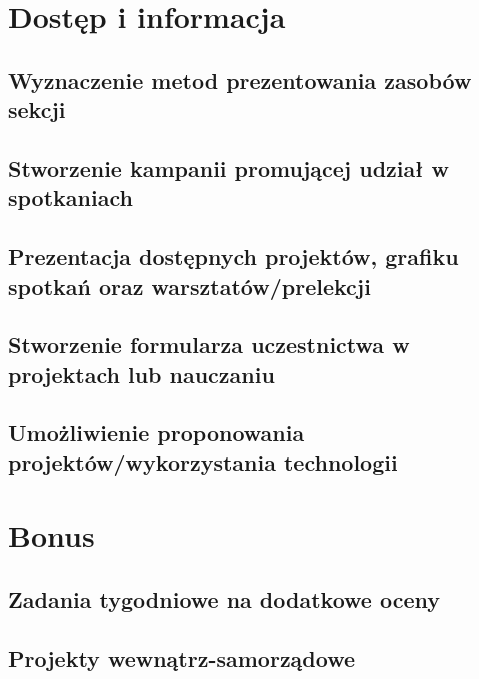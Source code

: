 \documentclass[9pt,a4paper]{report}
\begin{document}
\chapter{Dostęp i informacja}

\section{Wyznaczenie metod prezentowania zasobów sekcji}
\section{Stworzenie kampanii promującej udział w spotkaniach}
\section{Prezentacja dostępnych projektów, grafiku spotkań oraz warsztatów/prelekcji}
\section{Stworzenie formularza uczestnictwa w projektach lub nauczaniu}
\section{Umożliwienie proponowania projektów/wykorzystania technologii}

\chapter{Bonus}

\section{Zadania tygodniowe na dodatkowe oceny}
\section{Projekty wewnątrz-samorządowe}
\end{document}
